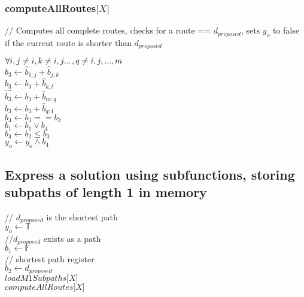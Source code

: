 \documentclass[11pt]{article}
\begin{document}
\subsubsection{computeAllRoutes$\lbrack X \rbrack$}
\vspace{1mm} // Computes all complete routes, checks for a route == $d_{proposed}$, sets $y_o$ to false if the current route is shorter than $d_{proposed}$
\begin{center}
$
\forall i,j \neq i, k \neq i,j ...\hspace{.5mm},q \neq i,j,...,m
$
\\ \vspace{2mm}
$
b_3 \leftarrow \hat{b}_{1;j}+ \hat{b}_{j;k}
$
\\ \vspace{2mm}
$
b_3 \leftarrow b_3 + \hat{b}_{k;l}
$
\\ \vspace{2mm}
$
...
$
\\ \vspace{2mm}
$
b_3 \leftarrow b_3 + \hat{b}_{m;q}
$
\\ \vspace{2mm}
$
b_3 \leftarrow b_3 + \hat{b}_{q;1}
$
\\ \vspace{2mm}
$
b_4 \leftarrow b_3 == b_2
$
\\ \vspace{2mm}
$
b_1 \leftarrow b_1 \lor b_4
$
\\ \vspace{2mm}
$
b_4 \leftarrow b_2 \leq b_3
$
\\ \vspace{2mm}
$
y_o \leftarrow y_o \land b_4
$
\end{center}




\subsection{Express a solution using subfunctions, storing subpaths of length 1 in memory}
\begin{center}
\vspace{4mm}
// $d_{proposed}$ is the shortest path\\
$y_o \leftarrow \mathbb{T}$
\\ \vspace{3mm}
//$d_{proposed}$ exists as a path\\
$ b_1 \leftarrow \mathbb{F}$
\\ \vspace{3mm}
// shortest path register\\
$ b_2 \leftarrow d_{proposed}$
\\ \vspace{3mm}
$loadM1Subpaths\lbrack X\rbrack$
\\ \vspace{1mm}
$computeAllRoutes\lbrack X \rbrack$
\end{center}
\end{document}
